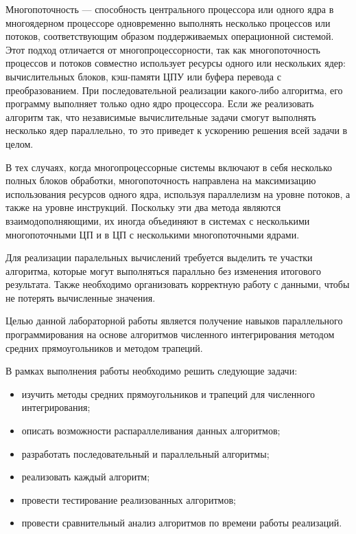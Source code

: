 \vspace{\baselineskip}

Многопоточность — способность центрального процессора или одного ядра в многоядерном процессоре одновременно выполнять несколько процессов или потоков, соответствующим образом поддерживаемых операционной системой.
Этот подход отличается от многопроцессорности, так как многопоточность процессов и потоков совместно использует ресурсы одного или нескольких ядер: вычислительных блоков, кэш-памяти ЦПУ или буфера перевода с преобразованием.
При последовательной реализации какого-либо алгоритма, его программу выполняет только одно ядро процессора. Если же реализовать алгоритм так, что независимые вычислительные задачи смогут выполнять несколько ядер параллельно, то это приведет к ускорению решения всей задачи в целом.

В тех случаях, когда многопроцессорные системы включают в себя несколько полных блоков обработки, многопоточность направлена на максимизацию использования ресурсов одного ядра, используя параллелизм на уровне потоков, а также на уровне инструкций.
Поскольку эти два метода являются взаимодополняющими, их иногда объединяют в системах с несколькими многопоточными ЦП и в ЦП с несколькими многопоточными ядрами.

Для реализации паралельных вычислений требуется выделить те участки алгоритма,
которые могут выполняться паралльно без изменения итогового результата. 
Также необходимо организовать корректную работу с данными, чтобы не потерять
вычисленные значения.

Целью данной лабораторной работы является получение навыков параллельного программирования на основе алгоритмов численного интегрирования методом средних прямоугольников и методом трапеций.

В рамках выполнения работы необходимо решить следующие задачи:

\begin{itemize}[label=---]
    \item изучить методы средних прямоугольников и трапеций для численного интегрирования;
    \item описать возможности распараллеливания данных алгоритмов;
    \item разработать последовательный и параллельный алгоритмы;
    \item реализовать каждый алгоритм;
    \item провести тестирование реализованных алгоритмов;
    \item провести сравнительный анализ алгоритмов по времени работы
          реализаций.
\end{itemize}
